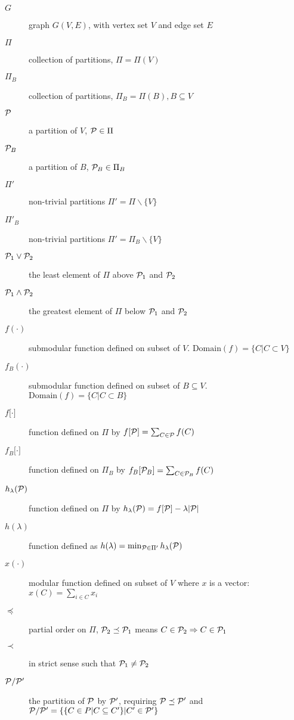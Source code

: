 \begin{description}
\item[$G$] graph $G(V,E)$, with vertex set $V$ and edge set $E$
\item[$\Pi$] collection of partitions, $\Pi = \Pi(V)$
\item[$\Pi_B$] collection of partitions, $\Pi_B = \Pi(B), B\subseteq V$
\item[$\P$] a partition of $V$, $\P \in \Pi$
\item[$\P_B$] a partition of $B$, $\P_B \in \Pi_B$
\item[$\Pi'$] non-trivial partitions $\Pi' = \Pi \backslash \{V\}$
\item[$\Pi'_B$] non-trivial partitions $\Pi' = \Pi_B \backslash \{V\}$
\item[$\P_1 \vee \P_2$] the least element of $\Pi$ above $\P_1$ and $\P_2$
\item[$\P_1 \wedge \P_2$] the greatest element of $\Pi$ below $\P_1$ and $\P_2$
\item[$f(\cdot)$] submodular function defined on subset of $V$. $\mathrm{Domain}(f)=\{C| C\subset V\}$
\item[$f_B(\cdot)$] submodular function defined on subset of $B\subseteq V$. $\mathrm{Domain}(f)=\{C| C\subset B\}$
\item[$f{[}\cdot{]}$] function defined on $\Pi$ by $f[\P] = \sum_{C\in \P} f(C)$
\item[$f_B{[}\cdot{]}$] function defined on $\Pi_B$ by $f_B[\P_B] = \sum_{C\in \P_B} f(C)$
\item[$h_{\lambda}(\P)$] function defined on $\Pi$ by $h_{\lambda}(\P)=f[\P]-\lambda\abs{\P}$
\item[$h(\lambda)$] function defined as $ h(\lambda) = \min_{\P \in \Pi'} h_{\lambda}(\P)$
\item[$x(\cdot)$] modular function defined on subset of $V$ where $x$ is a vector: $x(C)=\sum_{i \in C} x_i$
\item[$\preceq$] partial order on $\Pi$, $\P_2 \preceq \P_1$ means $C\in \P_2 \Rightarrow C \in \P_1$
\item[$\prec$] in strict sense such that $\P_1 \neq \P_2 $
\item[$\P/\P'$] the partition of $\P$ by $\P'$, requiring $\P\preceq \P'$ and $\P/\P'=\{\{ C \in P | C \subseteq C' \} | C' \in \P'\}$
\end{description}

